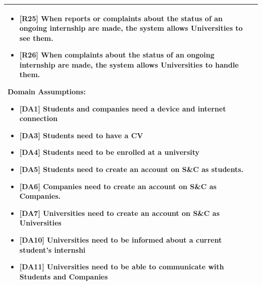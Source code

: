 \begin{longtable}{|p{}|p{}|}
\begin{itemize}
    \item \textbf{[R25]} When reports or complaints about the status of an ongoing internship are made, the system allows Universities to see them.
    \item \textbf{[R26]} When complaints about the status of an ongoing internship are made, the system allows Universities to handle them.
\end{itemize}
\textbf{Domain Assumptions:}
\begin{itemize}
    \item \textbf{[DA1]} Students and companies need a device and internet connection
     \item \textbf{[DA3]} Students need to have a CV
     \item \textbf{[DA4]} Students need to be enrolled at a university
    \item \textbf{[DA5]} Students need to create an account on S\&C as students.
    \item \textbf{[DA6]} Companies need to create an account on S\&C as Companies.
    \item \textbf{[DA7]} Universities need to create an account on S\&C as Universities
    \item \textbf{[DA10]} Universities need to be informed about a current student’s internshi
    \item \textbf{[DA11]} Universities need to be able to communicate with Students and Companies

\end{itemize} \\
\hline
\end{longtable}

\pagebreak


